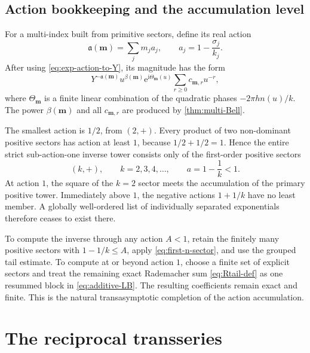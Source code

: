\documentclass[11pt]{article}
\numberwithin{equation}{section}
\theoremstyle{mainthm}
\theoremstyle{defstyle}
\theoremstyle{remark}
\newcommand{\e}{\mathrm e}
\newcommand{\ii}{\mathrm i}
\begin{document}
\subsection{Action bookkeeping and the accumulation level}

For a multi-index built from primitive sectors, define its real action
\begin{equation}\label{eq:multi-action}
 \mathfrak a(\bm m)=\sum_jm_ja_j,
 \qquad a_j=1-\frac{\sigma_j}{k_j}.
\end{equation}
After using \eqref{eq:exp-action-to-Y}, its magnitude has the form
\begin{equation}\label{eq:multi-sector-shape}
 Y^{-\mathfrak a(\bm m)}
 u^{\beta(\bm m)}
 \e^{\ii\Theta_{\bm m}(u)}
 \sum_{r\ge0}c_{\bm m,r}u^{-r},
\end{equation}
where \(\Theta_{\bm m}\) is a finite linear combination of the quadratic phases \(-2\pi h n(u)/k\).  The power \(\beta(\bm m)\) and all \(c_{\bm m,r}\) are produced by \cref{thm:multi-Bell}.

The smallest action is \(1/2\), from \((2,+)\).  Every product of two non-dominant positive sectors has action at least \(1\), because \(1/2+1/2=1\).  Hence the entire strict sub-action-one inverse tower consists only of the first-order positive sectors
\begin{equation}\label{eq:sub-action-one}
 (k,+),\qquad k=2,3,4,\ldots,
 \qquad a=1-\frac1k<1.
\end{equation}
At action \(1\), the square of the \(k=2\) sector meets the accumulation of the primary positive tower.  Immediately above \(1\), the negative actions \(1+1/k\) have no least member.  A globally well-ordered list of individually separated exponentials therefore ceases to exist there.

\begin{methodbox}
To compute the inverse through any action \(A<1\), retain the finitely many positive sectors with \(1-1/k\le A\), apply \eqref{eq:first-n-sector}, and use the grouped tail estimate.  To compute at or beyond action \(1\), choose a finite set of explicit sectors and treat the remaining exact Rademacher sum \eqref{eq:Rtail-def} as one resummed block in \eqref{eq:additive-LB}.  The resulting coefficients remain exact and finite.  This is the natural transasymptotic completion of the action accumulation.
\end{methodbox}

\section{The reciprocal transseries}\label{sec:reciprocal}
\end{document}
